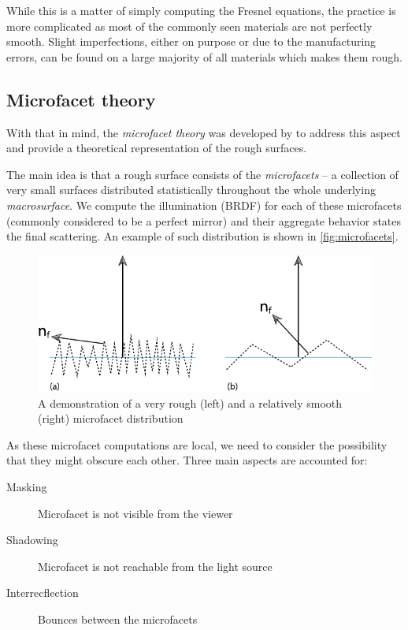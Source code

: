 While this is a matter of simply computing the Fresnel equations, the practice is more complicated as most of the commonly seen materials are not perfectly smooth. Slight imperfections, either on purpose or due to the manufacturing errors, can be found on a large majority of all materials which makes them rough.

\subsection{Microfacet theory}
With that in mind, the \emph{microfacet theory} was developed by \citet{cook1982reflectance} to address this aspect and provide a theoretical representation of the rough surfaces.

The main idea is that a rough surface consists of the \emph{microfacets} -- a collection of very small surfaces distributed statistically throughout the whole underlying \emph{macrosurface}. We compute the illumination (BRDF) for each of these microfacets (commonly considered to be a perfect mirror) and their aggregate behavior states the final scattering. An example of such distribution is shown in \autoref{fig:microfacets}.

\begin{figure}[h]
	\centering
	\includegraphics[width=.8\linewidth]{img/microfacets.pdf}
	\caption{A demonstration of a very rough (left) and a relatively smooth (right) microfacet distribution~\cite{pharr2016physically}}
	\label{fig:microfacets}
\end{figure}

As these microfacet computations are local, we need to consider the possibility that they might obscure each other. Three main aspects are accounted for:
\begin{description}
	\item[Masking] Microfacet is not visible from the viewer
	\item[Shadowing] Microfacet is not reachable from the light source
	\item[Interrecflection] Bounces between the microfacets
\end{description}

